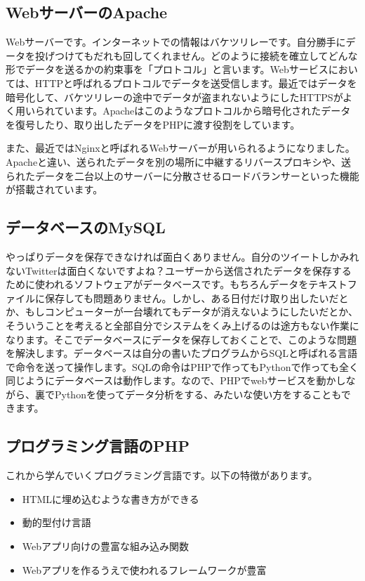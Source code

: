 \subsection{WebサーバーのApache}

Webサーバーです。インターネットでの情報はバケツリレーです。自分勝手にデータを投げつけてもだれも回してくれません。どのように接続を確立してどんな形でデータを送るかの約束事を「プロトコル」と言います。Webサービスにおいては、HTTPと呼ばれるプロトコルでデータを送受信します。最近ではデータを暗号化して、バケツリレーの途中でデータが盗まれないようにしたHTTPSがよく用いられています。Apacheはこのようなプロトコルから暗号化されたデータを復号したり、取り出したデータをPHPに渡す役割をしています。

また、最近ではNginxと呼ばれるWebサーバーが用いられるようになりました。Apacheと違い、送られたデータを別の場所に中継するリバースプロキシや、送られたデータを二台以上のサーバーに分散させるロードバランサーといった機能が搭載されています。

\subsection{データベースのMySQL}

やっぱりデータを保存できなければ面白くありません。自分のツイートしかみれないTwitterは面白くないですよね？ユーザーから送信されたデータを保存するために使われるソフトウェアがデータベースです。もちろんデータをテキストファイルに保存しても問題ありません。しかし、ある日付だけ取り出したいだとか、もしコンピューターが一台壊れてもデータが消えないようにしたいだとか、そういうことを考えると全部自分でシステムをくみ上げるのは途方もない作業になります。そこでデータベースにデータを保存しておくことで、このような問題を解決します。データベースは自分の書いたプログラムからSQLと呼ばれる言語で命令を送って操作します。SQLの命令はPHPで作ってもPythonで作っても全く同じようにデータベースは動作します。なので、PHPでwebサービスを動かしながら、裏でPythonを使ってデータ分析をする、みたいな使い方をすることもできます。

\subsection{プログラミング言語のPHP}

これから学んでいくプログラミング言語です。以下の特徴があります。

\begin{itemize}
  \item HTMLに埋め込むような書き方ができる
  \item 動的型付け言語
  \item Webアプリ向けの豊富な組み込み関数
  \item Webアプリを作るうえで使われるフレームワークが豊富
\end{itemize}

